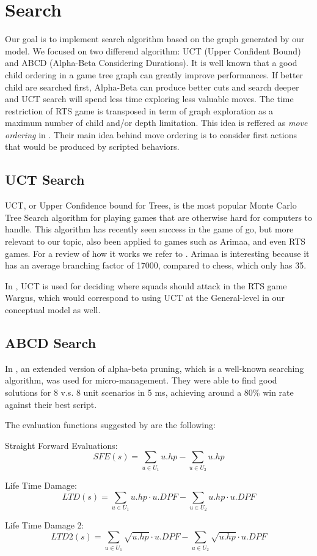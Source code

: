 \section{Search}

Our goal is to implement search algorithm based on the graph generated by our model. 
We focused on two differend algorithm: UCT (Upper Confident Bound) and ABCD (Alpha-Beta Considering Durations).  
It is well known that a good child ordering in a game tree graph can greatly improve performances.  
If better child are searched first, Alpha-Beta can produce better cuts and search deeper and UCT search will spend less time exploring less valuable moves. 
The time restriction of RTS game is transposed in term of graph exploration as a maximum number of child and/or depth limitation. 
This idea is reffered as \emph{move ordering} in \cite{portfolio}.
Their main idea behind move ordering is to consider first actions that would be produced by scripted behaviors.

\subsection{UCT Search}
UCT, or Upper Confidence bound for Trees, is the most popular Monte Carlo Tree Search algorithm for playing games that are otherwise hard for computers to handle.
This algorithm has recently seen success in the game of go, but more relevant to our topic, also been applied to games such as Arimaa, and even RTS games. For a review of how it works we refer to \cite{mcts}.
Arimaa is interesting because it has an average branching factor of 17000, compared to chess, which only has 35. \cite{arimaawiki}

In \cite{wargusuct}, UCT is used for deciding where squads should attack in the RTS game Wargus, which would correspond to using UCT at the General-level in our conceptual model as well.

\subsection{ABCD Search}
In \cite{abcd}, an extended version of alpha-beta pruning, which is a well-known searching algorithm, was used for micro-management. 
They were able to find good solutions for 8 v.s. 8 unit scenarios in 5 ms, achieving around a 80\% win rate against their best script.

The evaluation functions suggested by \cite{abcd} are the following:
\begin{shortitem}
\item Straight Forward Evaluations:
$$
    \displaystyle{SFE(s) = \sum_{u \in U_1} u.hp - \sum_{u \in U_2} u.hp } 
$$

\item Life Time Damage:
$$
    \displaystyle{LTD(s) = \sum_{u \in U_1} u.hp \cdot u.DPF- \sum_{u \in U_2} u.hp \cdot u.DPF } 
$$

\item Life Time Damage 2:
$$
    \displaystyle{LTD2(s) = \sum_{u \in U_1} \sqrt{u.hp} \cdot u.DPF - \sum_{u \in U_2} \sqrt{u.hp} \cdot u.DPF } 
$$
\end{shortitem}

